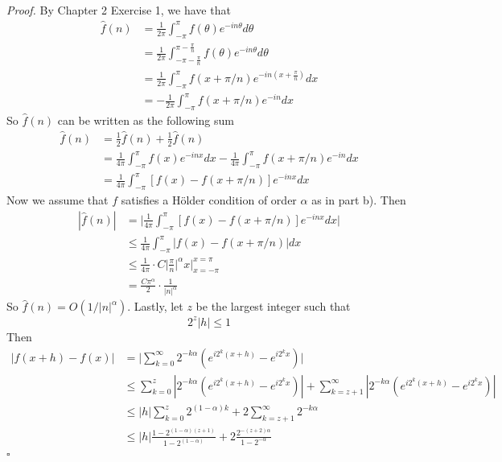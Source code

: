 \documentclass[12pt]{article}
\newenvironment{proof}{\textit{Proof.}}{\hfill$\square$}
\newcommand*\Eval[3]{\left.#1\right\rvert_{#2}^{#3}}
\begin{document}
\vspace{2em}
\begin{proof}
    By Chapter 2 Exercise 1, we have that 
    \begin{align*}
        \hat{f}(n)&=\frac{1}{2\pi}\int_{-\pi}^{\pi}f(\theta)e^{-in\theta}d\theta\\
        &=\frac{1}{2\pi}\int_{-\pi-\frac{\pi}{n}}^{\pi-\frac{\pi}{n}}f(\theta)e^{-in\theta}d\theta\\
        &=\frac{1}{2\pi}\int_{-\pi}^{\pi}f(x+\pi/n)e^{-in(x+\frac{\pi}{n})}dx\\
        &=-\frac{1}{2\pi}\int_{-\pi}^{\pi}f(x+\pi/n)e^{-in}dx
    \end{align*}
    \newpage
    So $\hat{f}(n)$ can be written as the following sum
    \begin{align*}
        \hat{f}(n)&=\frac{1}{2}\hat{f}(n)+\frac{1}{2}\hat{f}(n)\\
        &=\frac{1}{4\pi}\int_{-\pi}^{\pi}f(x)e^{-inx}dx-\frac{1}{4\pi}\int_{-\pi}^{\pi}f(x+\pi/n)e^{-in}dx\\
        &=\frac{1}{4\pi}\int_{-\pi}^{\pi}[f(x) - f(x + \pi/n)]e^{-inx}dx
    \end{align*}
    Now we assume that $f$ satisfies a Hölder condition of order $\alpha$ as in part b). Then
    \begin{align*}
        |\hat{f}(n)|&=\Big|\frac{1}{4\pi}\int_{-\pi}^{\pi}[f(x) - f(x + \pi/n)]e^{-inx}dx\Big|\\
        &\le\frac{1}{4\pi}\int_{-\pi}^{\pi}|f(x) - f(x + \pi/n)|dx \\
        &\le\frac{1}{4\pi}\cdot C\Big|\frac{\pi}{n}\Big|^\alpha\Eval{x}{x=-\pi}{x=\pi}\\
        &=\frac{C\pi^\alpha}{2}\cdot\frac{1}{|n|^\alpha}
    \end{align*}
    So $\hat{f}(n)=O(1/|n|^\alpha)$. Lastly, let $z$ be the largest integer such that
    \begin{equation*}
        2^z|h|\le1
    \end{equation*}
    Then
    \begin{align*}
        |f(x+h)-f(x)|&=\Big|\sum_{k=0}^{\infty}2^{-k\alpha}(e^{i2^k(x+h)}-e^{i2^kx})\Big|\\
        &\le\sum_{k=0}^{z}|2^{-k\alpha}(e^{i2^k(x+h)}-e^{i2^kx})|+\sum_{k=z+1}^{\infty}|2^{-k\alpha}(e^{i2^k(x+h)}-e^{i2^kx})| \\
        &\le|h|\sum_{k=0}^{z}2^{(1-\alpha)k}+2\sum_{k=z+1}^{\infty}2^{-k\alpha}\\
        &\le|h|\frac{1-2^{(1-\alpha)(z+1)}}{1-2^{(1-\alpha)}}+2\frac{2^{-(z+2)\alpha}}{1-2^{-\alpha}}\\

\end{align*}
\end{proof}
\end{document}
